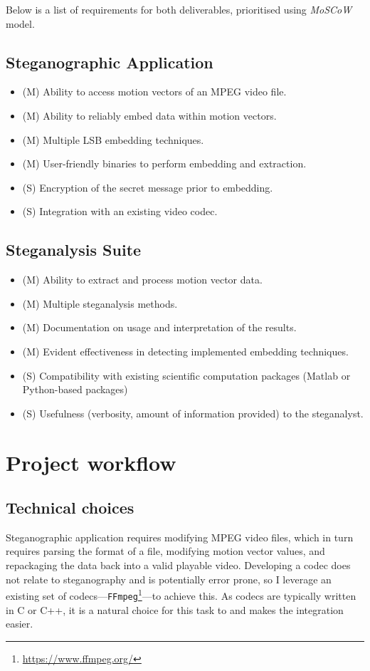 \documentclass[12pt,british,twoside,notitlepage,usenames,dvipsnames,hypens,final]{report}
\numberwithin{equation}{section}
\numberwithin{figure}{section}
\begin{document}
Below is a list of requirements for both deliverables, prioritised using \emph{MoSCoW} model.

\subsection{Steganographic Application}
\begin{itemize}
\item (M) Ability to access motion vectors of an MPEG video file.
\item (M) Ability to reliably embed data within motion vectors.
\item (M) Multiple LSB embedding techniques.
\item (M) User-friendly binaries to perform embedding and extraction.
\item (S) Encryption of the secret message prior to embedding.
\item (S) Integration with an existing video codec.
\end{itemize}

\subsection{Steganalysis Suite}
\begin{itemize}
\item (M) Ability to extract and process motion vector data.
\item (M) Multiple steganalysis methods.
\item (M) Documentation on usage and interpretation of the results.
\item (M) Evident effectiveness in detecting implemented embedding techniques.
\item (S) Compatibility with existing scientific computation packages (Matlab or Python-based packages)
\item (S) Usefulness (verbosity, amount of information provided) to the steganalyst.
\end{itemize}

\section{Project workflow}

\subsection{Technical choices}

Steganographic application requires modifying MPEG video files, which in turn requires parsing the format of a file, modifying motion vector values, and repackaging the data back into a valid playable video. Developing a codec does not relate to steganography and is potentially error prone, so I leverage an existing set of codecs---\texttt{FFmpeg}\footnote{\url{https://www.ffmpeg.org/}}---to achieve this. As codecs are typically written in C or C++, it is a natural choice for this task to and makes the integration easier.
\end{document}

